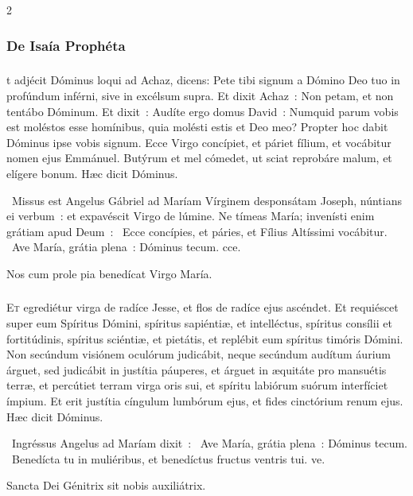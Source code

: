 \documentclass[9pt,twoside]{extarticle}
\begin{document}
\begin{multicols}{2}
\subsubsection*{\center De Isaía Prophéta}
\subsubsection*{\center {}}
t adjécit Dóminus loqui ad Achaz, dicens:
Pete tibi signum a Dómino Deo tuo in profúndum inférni, sive in excélsum supra.
Et dixit Achaz~: Non petam, et non tentábo Dóminum.
Et dixit~: Audíte ergo domus David~: Numquid parum vobis est moléstos esse homínibus, quia molésti estis et Deo meo?
Propter hoc dabit Dóminus ipse vobis signum. Ecce Virgo concípiet, et páriet fílium, et vocábitur nomen ejus Emmánuel.
Butýrum et mel cómedet, ut sciat reprobáre malum, et elígere bonum. Hæc dicit Dóminus.

\begin{tightlist}{}
\item {}~Missus est Angelus Gábriel ad Maríam Vírginem desponsátam Joseph, núntians ei verbum~: et expavéscit Virgo de lúmine. Ne tímeas María; invenísti enim grátiam apud Deum~: \textred{*}~Ecce concípies, et páries, et Fílius Altíssimi vocábitur.  ~Ave María, grátia plena~: Dóminus tecum. cce.
\item {\small {} Nos cum prole pia benedícat Virgo María.}
\end{tightlist}

\subsubsection*{}
\lettrine{E}t egrediétur virga de radíce Jesse, et flos de radíce ejus ascéndet.
Et requiéscet super eum Spíritus Dómini, spíritus sapiéntiæ, et intelléctus, spíritus consílii et fortitúdinis, spíritus sciéntiæ, et pietátis,
et replébit eum spíritus timóris Dómini. Non secúndum visiónem oculórum judicábit, neque secúndum audítum áurium árguet,
sed judicábit in justítia páuperes, et árguet in æquitáte pro mansuétis terræ, et percútiet terram virga oris sui, et spíritu labiórum suórum interfíciet ímpium.
Et erit justítia cíngulum lumbórum ejus, et fides cinctórium renum ejus.
Hæc dicit Dóminus.

\begin{tightlist}{}
\item {}~Ingréssus Angelus ad Maríam dixit~: \textred{*}~Ave María, grátia plena~: Dóminus tecum. ~Benedícta tu in muliéribus, et benedíctus fructus ventris tui. ve.
\item {\small {} Sancta Dei Génitrix sit nobis auxiliátrix.}
\end{tightlist}


\end{multicols}
\end{document}
